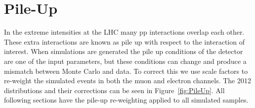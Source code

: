 

\section{Pile-Up}


In the extreme intensities at the LHC many pp interactions overlap each other.  These extra interactions are known as pile up with respect to the interaction of interest. When simulations are generated the pile up conditions of the detector are one of the input parameters, but these conditions can change and produce a mismatch between Monte Carlo and data.  To correct this we use scale factors to re-weight the simulated events in both the muon and electron channels.  The 2012 distributions and their corrections can be seen in Figure~\ref{fig:PileUp}. All following sections have the pile-up re-weighting applied to all simulated samples.  

